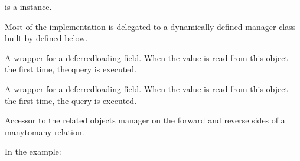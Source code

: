 \documentclass[letterpaper,10pt,english]{sphinxmanual}
\begin{document}
\begin{fulllineitems}
\begin{fulllineitems}
\sphinxAtStartPar
{} is a  instance.

\sphinxAtStartPar
Most of the implementation is delegated to a dynamically defined manager
class built by  defined below.

\end{fulllineitems}


\begin{fulllineitems}
\label{\detokenize{app:app.models.io_type.io_type_name}}
\pysigstartsignatures
{}
\pysigstopsignatures
\sphinxAtStartPar
A wrapper for a deferred\sphinxhyphen{}loading field. When the value is read from this
object the first time, the query is executed.

\end{fulllineitems}


\begin{fulllineitems}
\label{\detokenize{app:app.models.io_type.io_type_symbol}}
\pysigstartsignatures
{}
\pysigstopsignatures
\sphinxAtStartPar
A wrapper for a deferred\sphinxhyphen{}loading field. When the value is read from this
object the first time, the query is executed.

\end{fulllineitems}


\begin{fulllineitems}
\label{\detokenize{app:app.models.io_type.modele_io_mapping_set}}
\pysigstartsignatures
{}
\pysigstopsignatures
\sphinxAtStartPar
Accessor to the related objects manager on the forward and reverse sides of
a many\sphinxhyphen{}to\sphinxhyphen{}many relation.

\sphinxAtStartPar
In the example:

\begin{sphinxVerbatim}[commandchars=\\\{\}]
 
       
\end{sphinxVerbatim}


\end{fulllineitems}
\end{fulllineitems}
\end{document}
